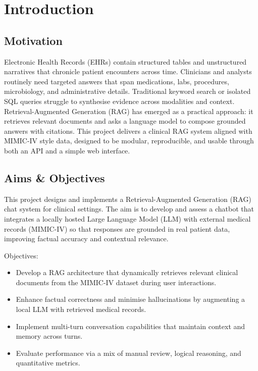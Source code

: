 \chapter{Introduction}

\section{Motivation}
Electronic Health Records (EHRs) contain structured tables and unstructured narratives that chronicle patient encounters across time. Clinicians and analysts routinely need targeted answers that span medications, labs, procedures, microbiology, and administrative details. Traditional keyword search or isolated SQL queries struggle to synthesise evidence across modalities and context. Retrieval-Augmented Generation (RAG) has emerged as a practical approach: it retrieves relevant documents and asks a language model to compose grounded answers with citations. This project delivers a clinical RAG system aligned with MIMIC-IV style data, designed to be modular, reproducible, and usable through both an API and a simple web interface.

\section{Aims \& Objectives}
This project designs and implements a Retrieval-Augmented Generation (RAG) chat system for clinical settings. The aim is to develop and assess a chatbot that integrates a locally hosted Large Language Model (LLM) with external medical records (MIMIC-IV) so that responses are grounded in real patient data, improving factual accuracy and contextual relevance.

\noindent Objectives:
\begin{itemize}
  \item Develop a RAG architecture that dynamically retrieves relevant clinical documents from the MIMIC-IV dataset during user interactions.
  \item Enhance factual correctness and minimise hallucinations by augmenting a local LLM with retrieved medical records.
  \item Implement multi-turn conversation capabilities that maintain context and memory across turns.
  \item Evaluate performance via a mix of manual review, logical reasoning, and quantitative metrics.
\end{itemize}

